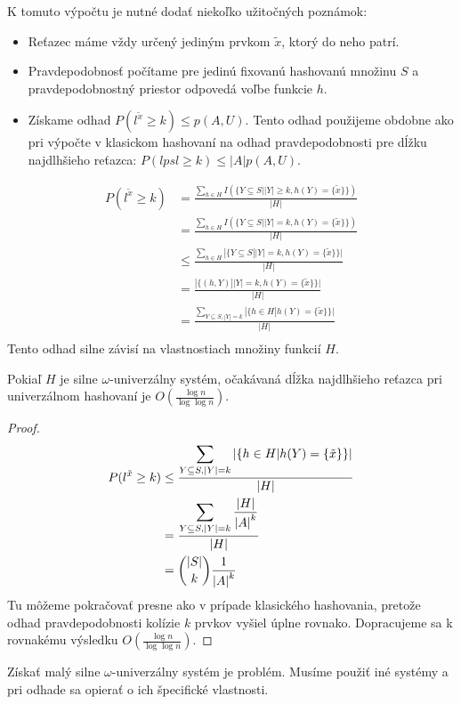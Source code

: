 K tomuto výpočtu je nutné dodať niekoľko užitočných poznámok:
\begin{itemize}
\item Reťazec máme vždy určený jediným prvkom $\tilde{x}$, ktorý do neho patrí.
\item Pravdepodobnosť počítame pre jedinú fixovanú hashovanú množinu $S$ a pravdepodobnostný priestor odpovedá voľbe funkcie $h$.
\item Získame odhad $P(l^{\tilde{x}} \geq k) \leq p(A, U)$. Tento odhad použijeme obdobne ako pri výpočte v klasickom hashovaní na odhad pravdepodobnosti pre dĺžku najdlhšieho reťazca: $P(lpsl \geq k) \leq |A| p(A, U)$.
\end{itemize}
\begin{displaymath}
\begin{split}
P(l^{\tilde{x}} \geq k) 
	& = \frac{\displaystyle \sum_{h \in H} I(\{ Y \subseteq S | |Y| \geq k, h(Y) = \{ \tilde{x} \} \})}{|H|} \\
	& = \frac{\displaystyle \sum_{h \in H} I(\{ Y \subseteq S | |Y| = k, h(Y) = \{ \tilde{x} \} \})}{|H|} \\
	& \leq \frac{\displaystyle \sum_{h \in H} |\{ Y \subseteq S | |Y| = k, h(Y) = \{ \tilde{x} \} \}|}{|H|} \\
	& = \frac{|\{ (h, Y) | |Y| = k, h(Y) = \{ \tilde{x} \} \}|}{|H|} \\
	& = \frac{\displaystyle \sum_{Y \subseteq S, |Y| = k} | \{ h \in H | h(Y) = \{\tilde{x}\} \}|}{|H|} \\
\end{split}
\end{displaymath}
Tento odhad silne závisí na vlastnostiach množiny funkcií $H$.
\begin{theorem}
Pokiaľ $H$ je silne $\omega$-univerzálny systém, očakávaná dĺžka najdlhšieho reťazca pri univerzálnom hashovaní je $O(\frac{\log n}{\log \log n})$.
\end{theorem}
\begin{proof}
\begin{displaymath}
\begin{split}
P(l^{\tilde{x}} \geq k) 
	& \leq \frac{\displaystyle \sum_{Y \subseteq S, |Y| = k} | \{ h \in H | h(Y) = \{\tilde{x}\} \}|}{|H|} \\
	& = \frac{\displaystyle \sum_{Y \subseteq S, |Y| = k} \frac{|H|}{{|A|}^{k}}}{|H|} \\
	& = \dbinom{|S|}{k}\frac{1}{{|A|}^k}
\end{split}
\end{displaymath}
Tu môžeme pokračovať presne ako v prípade klasického hashovania, pretože odhad pravdepodobnosti kolízie $k$ prvkov vyšiel úplne rovnako. Dopracujeme sa k rovnakému výsledku $O(\frac{\log n}{\log \log n})$.
\end{proof}
Získať malý silne $\omega$-univerzálny systém je problém. Musíme použiť iné systémy a pri odhade sa opierať o ich špecifické vlastnosti.
